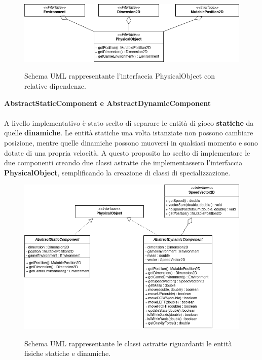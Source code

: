 \begin{figure}[H]
	\centering{}
	\includegraphics[width=\textwidth]{img/physicalObject}
	\label{img:physicalObject}
	\caption{Schema UML rappresentante l'interfaccia PhysicalObject con relative dipendenze. \\}
\end{figure}

\newpage

\textbf{AbstractStaticComponent e AbstractDynamicComponent} \\ \\
A livello implementativo è stato scelto di separare le entità di gioco \textbf{statiche} da quelle \textbf{dinamiche}.
Le entità statiche una volta istanziate non possono cambiare posizione, mentre quelle dinamiche possono muoversi in qualsiasi momento e sono dotate di una propria velocità. A questo proposito ho scelto di implementare le due componenti creando due classi astratte che implementassero l'interfaccia \textbf{PhysicalObject}, semplificando la creazione di classi di specializzazione.

\begin{figure}[H]
	\centering{}
	\includegraphics[width=\textwidth]{img/components}
	\label{img:components.png}
	\caption{Schema UML rappresentante le classi astratte riguardanti le entità fisiche statiche e dinamiche. \\}
\end{figure}

